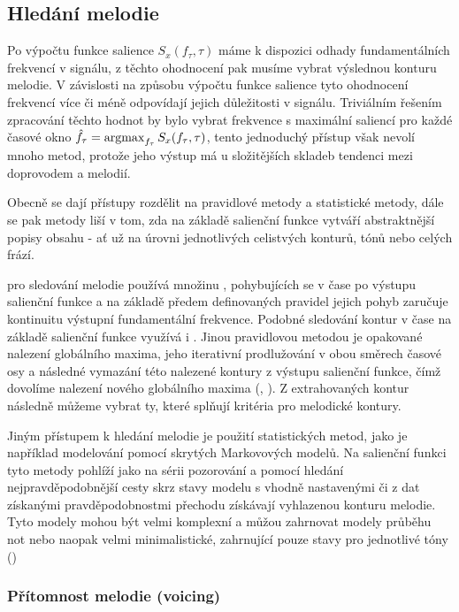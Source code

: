 \subsection{Hledání melodie}

Po výpočtu funkce salience $S_x(f_\tau, \tau)$ máme k dispozici odhady fundamentálních frekvencí v signálu, z těchto ohodnocení pak musíme vybrat výslednou konturu melodie. V závislosti na způsobu výpočtu funkce salience tyto ohodnocení frekvencí více či méně odpovídají jejich důležitosti v signálu. Triviálním řešením zpracování těchto hodnot by bylo vybrat frekvence s maximální saliencí pro každé časové okno $\hat{f}_\tau = \argmax_{f_\tau}{S_x(f_\tau, \tau)}$, tento jednoduchý přístup však nevolí mnoho metod, protože jeho výstup má u složitějších skladeb tendenci  mezi doprovodem a melodií.

Obecně se dají přístupy rozdělit na pravidlové metody a statistické metody, dále se pak metody liší v tom, zda na základě salienční funkce vytváří abstraktnější popisy obsahu - ať už na úrovni jednotlivých celistvých konturů, tónů nebo celých frází.

\cite{Goto1999} pro sledování melodie používá množinu , pohybujících se v čase po výstupu salienční funkce a na základě předem definovaných pravidel jejich pohyb zaručuje kontinuitu výstupní fundamentální frekvence. Podobné sledování kontur v čase na základě salienční funkce využívá i \cite{Dressler2009}. Jinou pravidlovou metodou je opakované nalezení globálního maxima, jeho iterativní prodlužování v obou směrech časové osy a následné vymazání této nalezené kontury z výstupu salienční funkce, čímž dovolíme nalezení nového globálního maxima (\cite{Cancela2008}, \cite{Salamon2012a}). Z extrahovaných kontur následně můžeme vybrat ty, které splňují kritéria pro melodické kontury.

Jiným přístupem k hledání melodie je použití statistických metod, jako je například modelování pomocí skrytých Markovových modelů. Na salienční funkci tyto metody pohlíží jako na sérii pozorování a pomocí hledání nejpravděpodobnější cesty skrz stavy modelu s vhodně nastavenými či z dat získanými pravděpodobnostmi přechodu získávají vyhlazenou konturu melodie. Tyto modely mohou být velmi komplexní a můžou zahrnovat modely průběhu not \citep{Ryynanen2008} nebo naopak velmi minimalistické, zahrnující pouze stavy pro jednotlivé tóny (\cite{Yeh2012})

\subsubsection{Přítomnost melodie (voicing)}

